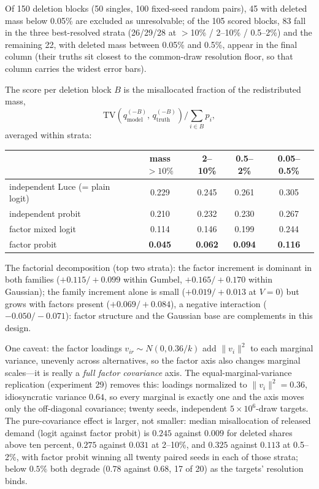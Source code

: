 \documentclass[12pt]{article}
\theoremstyle{remark}
\begin{document}
Of 150 deletion blocks (50 singles, 100 fixed-seed random pairs), 45 with
deleted mass below 0.05\% are excluded as unresolvable; of the 105 scored
blocks, 83 fall in the three best-resolved strata (26/29/28 at $>$10\% /
2--10\% / 0.5--2\%) and the remaining 22, with deleted mass between
0.05\% and 0.5\%, appear in the final column (their truths sit closest to
the common-draw resolution floor, so that column carries the widest error
bars).

The score per deletion block $B$ is the
misallocated fraction of the redistributed mass,
\[
\mathrm{TV}\!\left(q^{(-B)}_{\mathrm{model}},\,
q^{(-B)}_{\mathrm{truth}}\right) \Big/ \textstyle\sum_{i \in B} p_i ,
\]
averaged within strata:

\begin{center}
\begin{tabular}{lcccc}
\toprule
 & mass $>10\%$ & 2--10\% & 0.5--2\% & 0.05--0.5\% \\
\midrule
independent Luce (= plain logit) & 0.229 & 0.245 & 0.261 & 0.305 \\
independent probit & 0.210 & 0.232 & 0.230 & 0.267 \\
factor mixed logit & 0.114 & 0.146 & 0.199 & 0.244 \\
factor probit & \textbf{0.045} & \textbf{0.062} & \textbf{0.094} & \textbf{0.116} \\
\bottomrule
\end{tabular}
\end{center}

The factorial decomposition (top two strata): the factor increment is
dominant in both families ($+0.115/+0.099$ within Gumbel, $+0.165/+0.170$
within Gaussian); the family increment alone is small ($+0.019/+0.013$ at $V
= 0$) but grows with factors present ($+0.069/+0.084$), a negative
interaction ($-0.050/-0.071$): factor structure and the Gaussian base are
complements in this design.

One caveat: the factor loadings $v_{ir} \sim N(0, 0.36/k)$
add $\|v_i\|^2$ to each marginal variance, unevenly across
alternatives, so the factor axis also changes marginal scales---it is
really a \emph{full factor covariance} axis.
The equal-marginal-variance replication (experiment 29) removes this:
loadings normalized to $\|v_i\|^2 = 0.36$, idiosyncratic variance
$0.64$, so every marginal is exactly one and the axis moves only the
off-diagonal covariance; twenty seeds, independent $5\times10^6$-draw
targets. The pure-covariance effect is larger, not smaller: median
misallocation of released demand (logit against factor probit) is
$0.245$ against $0.009$ for deleted shares above ten percent,
$0.275$ against $0.031$ at 2--10\%, and $0.325$ against $0.113$ at
0.5--2\%, with factor probit winning all twenty paired seeds in each of
those strata; below $0.5\%$ both degrade ($0.78$ against $0.68$, 17 of
20) as the targets' resolution binds.
\end{document}
